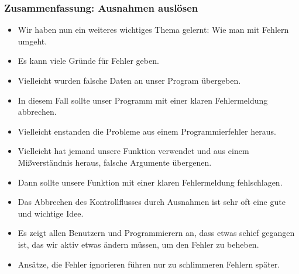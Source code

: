 \documentclass[aspectratio=169,mathserif,notheorems]{beamer}%
\begin{document}
\begin{frame}%
\frametitle{Zusammenfassung: Ausnahmen auslösen}%
\begin{itemize}%
%
\item Wir haben nun ein weiteres wichtiges Thema gelernt: Wie man mit Fehlern umgeht.%
%
\item<2-> Es kann viele Gründe für Fehler geben.%
%
\item<3-> Vielleicht wurden falsche Daten an unser Program übergeben.%
%
\item<4-> In diesem Fall sollte unser Programm mit einer klaren Fehlermeldung abbrechen.%
%
\item<5-> Vielleicht enstanden die Probleme aus einem Programmierfehler heraus.%
%
\item<6-> Vielleicht hat jemand unsere Funktion verwendet und aus einem Mißverständnis heraus, falsche Argumente übergenen.%
%
\item<7-> Dann sollte unsere Funktion mit einer klaren Fehlermeldung fehlschlagen.%
%
\item<8-> Das Abbrechen des Kontrollflusses durch Ausnahmen ist sehr oft eine gute und wichtige Idee.%
%
\item<9-> Es zeigt allen Benutzern und Programmierern an, dass etwas schief gegangen ist, das wir aktiv etwas ändern müssen, um den Fehler zu beheben.%
%
\item<10-> Ansätze, die Fehler ignorieren führen nur zu schlimmeren Fehlern später.%
\end{itemize}%
\end{frame}%
%
%
\end{document}
